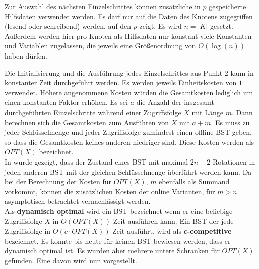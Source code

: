 \documentclass[a4paper,12pt]{article}
\begin{document}
\noindent 	Zur Auswahl des nächsten Einzelschrittes können zusätzliche in $p$ gespeicherte Hilfsdaten verwendet werden. Es darf nur auf die Daten des Knotens zugegriffen (lesend oder schreibend) werden, auf den $p$ zeigt. Es wird $n = \vert K \vert$ gesetzt. Außerdem werden hier pro Knoten als Hilfsdaten nur konstant viele Konstanten und Variablen zugelassen, die jeweils eine Größenordnung von $O\left(\log \left(n\right)\right)$  haben dürfen.

\noindent Die Initialisierung und die Ausführung jedes Einzelschrittes aus Punkt 2 kann in konstanter Zeit durchgeführt werden. Es werden jeweils Einheitskosten von $1$ verwendet. Höhere angenommene Kosten würden die Gesamtkosten lediglich um einen konstanten Faktor erhöhen. Es sei $a$ die Anzahl der insgesamt durchgeführten Einzelschritte während einer Zugriffsfolge $X$ mit Länge $m$. Dann berechnen sich die Gesamtkosten zum Ausführen von $X$ mit $a + m$. Es muss zu jeder Schlüsselmenge und jeder Zugriffsfolge zumindest einen offline BST geben, so dass die Gesamtkosten keines anderen niedriger sind. Diese Kosten werden als \textbf{$\mathit{OPT\left(X\right)}$} bezeichnet.\\  In \cite{nRotations} wurde gezeigt, dass der Zustand eines BST mit maximal $2n -2$ Rotationen in jeden anderen BST mit der gleichen Schlüsselmenge überführt werden kann. Da bei der Berechnung der Kosten für  $\mathit{OPT(X)}$, $m$ ebenfalls als Summand vorkommt, können die zusätzlichen Kosten der online Varianten, für $m > n$ asymptotisch betrachtet vernachlässigt werden. \\
\noindent Als \textbf{dynamisch optimal } wird ein BST bezeichnet wenn er eine beliebige Zugriffsfolge $X$ in $O\left(\mathit{OPT}\left(X\right)\right)$ Zeit ausführen kann. Ein BST der jede Zugriffsfolge in $O\left(c \cdot \mathit{OPT}\left(X\right)\right)$ Zeit ausführt, wird als \textbf{c-competitive} bezeichnet. Es konnte bis heute für keinen BST bewiesen werden, dass er dynamisch optimal ist. Es wurden aber mehrere untere Schranken für $\mathit{OPT}\left(X\right)$ gefunden. Eine davon wird  nun vorgestellt.
\end{document}
